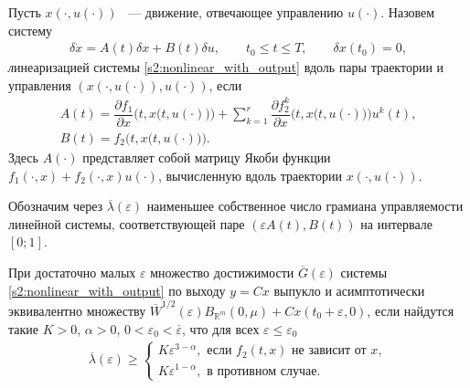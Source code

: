 \documentclass[../abstract.tex]{subfiles}
\begin{document}
\begin{definition}\label{s1:def:linearized_system}
	Пусть $ x(\cdot,u(\cdot)) $ ~--- движение, отвечающее управлению $ u(\cdot)$.
	Назовем систему
	\begin{gather}\label{s1:linearized_system}
		\delta \dot{x} = A(t) \delta x + B(t) \delta u, \qquad t_0 \leqslant t \leqslant T, \qquad \delta x(t_0) = 0,
	\end{gather}
	{\textit линеаризацией} системы \eqref{s2:nonlinear_with_output} вдоль пары траектории и управления $\left( x(\cdot,u(\cdot)),u(\cdot)\right) $, если 
	\begin{gather*}
		A(t) = \dfrac{\partial f_1}{\partial x} \Big(t,x\big(t,u(\cdot)\big)\Big) 
		+ 
		\sum\limits_{k = 1}^{r}
		\dfrac{\partial f_2^k}{\partial x}\Big(t,x\big(t,u(\cdot)\big)\Big) u^k(t), \\
		B(t) = f_2 \Big(t,x\big(t,u(\cdot)\big)\Big).
	\end{gather*}
	Здесь $ A(\cdot) $ представляет собой матрицу Якоби функции $ f_1(\cdot, x) + f_2(\cdot, x) u(\cdot) $, вычисленную вдоль траектории $ x(\cdot,u(\cdot)) $.
\end{definition}

Обозначим через $\overline{\lambda}(\varepsilon)$ наименьшее собственное число грамиана управляемости линейной системы, соответствующей паре $(\varepsilon A(t), B(t))$  на интервале $ [0; 1]$.

\begin{theorem}\label{s2:th:assimptotic_equality}
	При достаточно малых $ \varepsilon $ множество достижимости $ \overline{G}(\varepsilon) $ системы \eqref{s2:nonlinear_with_output} по выходу $ y = C x $ выпукло и асимптотически эквивалентно множеству $\overline{W}^{1/2}(\varepsilon)B_{\mathbb{R}^m}(0,\mu) + Cx(t_0+\varepsilon,0)$, если найдутся такие $ K>0 $, $ \alpha > 0 $, $ 0< \varepsilon_0<\overline{\varepsilon} $, что для всех $ \varepsilon \leqslant \varepsilon_0 $
	\begin{gather}\label{s2:cond1}
		\overline{\lambda}(\varepsilon) \geqslant \left\{ {\begin{array}{*{20}{l}}
				{K\varepsilon ^{3 - \alpha}, \mbox{\ если \ } f_2(t,x) \mbox{\ не зависит от \ } x}, \\
				{K\varepsilon ^{1 - \alpha}}, \mbox{\ в противном случае}.
		\end{array}} \right.
	\end{gather}
\end{theorem}
\end{document}
